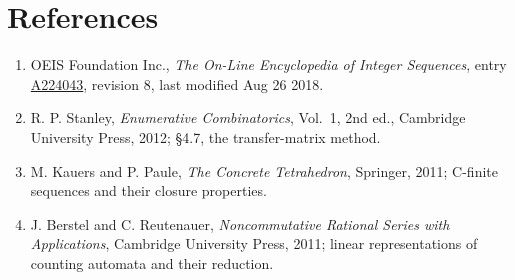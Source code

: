 \documentclass[11pt]{article}
\theoremstyle{definition}
\begin{document}
\section{References}

\begin{enumerate}

\item OEIS Foundation Inc., \emph{The On-Line Encyclopedia of Integer Sequences}, entry \href{https://oeis.org/A224043}{A224043}, revision 8, last modified Aug 26 2018.

\item R. P. Stanley, \emph{Enumerative Combinatorics}, Vol.~1, 2nd ed., Cambridge University Press, 2012; \S4.7, the transfer-matrix method.

\item M. Kauers and P. Paule, \emph{The Concrete Tetrahedron}, Springer, 2011; C-finite sequences and their closure properties.

\item J. Berstel and C. Reutenauer, \emph{Noncommutative Rational Series with Applications}, Cambridge University Press, 2011; linear representations of counting automata and their reduction.

\end{enumerate}
\end{document}

